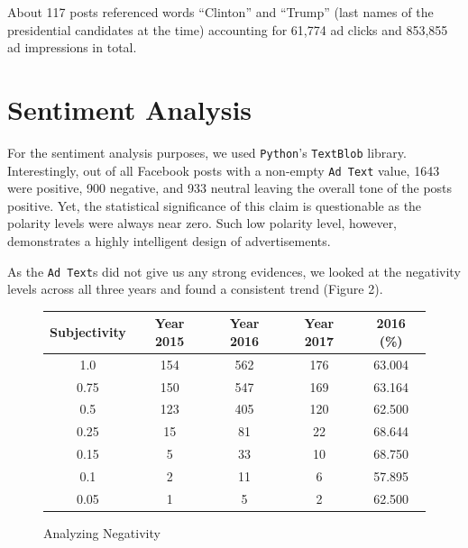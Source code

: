 \documentclass[11pt]{article}
\begin{document}
\bigskip

About 117 posts referenced words ``Clinton'' and ``Trump'' (last names of the
presidential candidates at the time) accounting for 61,774 ad clicks and
853,855 ad impressions in total.


\section*{\centering Sentiment Analysis}

For the sentiment analysis purposes, we used \texttt{Python}'s
\texttt{TextBlob} library. Interestingly, out of all Facebook posts with a
non-empty \texttt{Ad Text} value, 1643 were positive, 900 negative, and 933
neutral leaving the overall tone of the posts positive. Yet, the statistical
significance of this claim is questionable as the polarity levels were always
near zero. Such low polarity level, however, demonstrates a highly intelligent
design of advertisements.

\bigskip

As the \texttt{Ad Text}s did not give us any strong evidences, we looked at the
negativity levels across all three years and found a consistent trend (Figure 2).

\begin{figure}[H]
  \centering
  \begin{tabular}{*{5}{c}}
    \toprule
    Subjectivity & Year 2015 & Year 2016 & Year 2017 & 2016 (\%)\\
    \midrule
    1.0  & 154 & 562 & 176 & 63.004\\
    \midrule
    0.75 & 150 & 547 & 169 & 63.164\\
    \midrule
    0.5  & 123 & 405 & 120 & 62.500\\
    \midrule
    0.25 & 15 & 81 & 22 & 68.644\\
    \midrule
    0.15 & 5 & 33 & 10 & 68.750\\
    \midrule
    0.1  & 2 & 11 & 6 & 57.895\\
    \midrule
    0.05 & 1 & 5 & 2 & 62.500\\
    \bottomrule
  \end{tabular}
  \caption{Analyzing Negativity}
\end{figure}
\end{document}
